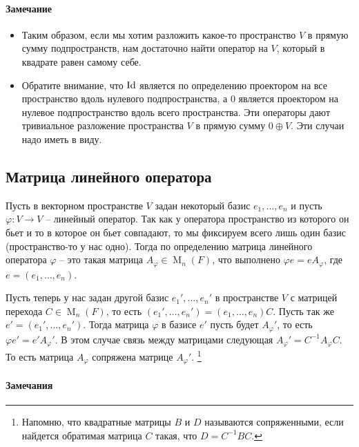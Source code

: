 \paragraph{Замечание}

\begin{itemize}
\item Таким образом, если мы хотим разложить какое-то пространство $V$ в прямую сумму подпространств, нам достаточно найти оператор на $V$, который в квадрате равен самому себе.

\item Обратите внимание, что $\operatorname{Id}$ является по определению проектором на все пространство вдоль  нулевого подпространства, а $0$ является проектором на нулевое подпространство вдоль всего пространства.
Эти операторы дают тривиальное разложение пространства $V$ в прямую сумму $0 \oplus V$.
Эти случаи надо иметь в виду.
\end{itemize}

\subsection{Матрица линейного оператора}
\label{section::LinearOpMatrix}

Пусть в векторном пространстве $V$ задан  некоторый базис $e_1,\ldots, e_n$ и пусть $\varphi \colon V\to V$ -- линейный оператор.
Так как у оператора пространство из которого он бьет и то в которое он бьет совпадают, то мы фиксируем всего лишь один базис (пространство-то у нас одно).
Тогда по определению матрица линейного оператора $\varphi$ -- это такая матрица $A_\varphi\in \operatorname{M}_{n}(F)$, что выполнено $\varphi e = e A_\varphi$, где $e = (e_1,\ldots,e_n)$.

Пусть теперь у нас задан другой базис $e_1',\ldots,e_n'$ в пространстве $V$ с матрицей перехода $C\in \operatorname{M}_n(F)$, то есть $(e_1',\ldots,e_n') = (e_1,\ldots,e_n)C$.
Пусть так же $e' = (e_1',\ldots,e_n')$.
Тогда матрица $\varphi$ в базисе $e'$ пусть будет $A_\varphi'$, то есть $\varphi e' = e' A_\varphi'$.
В этом случае связь между матрицами следующая $A_\varphi' = C^{-1}A_\varphi C$.
То есть матрица $A_\varphi$ сопряжена матрице $A_\varphi'$.%
\footnote{Напомню, что квадратные матрицы $B$ и $D$ называются сопряженными, если найдется обратимая матрица $C$ такая, что $D= C^{-1}BC$.}

\paragraph{Замечания}

